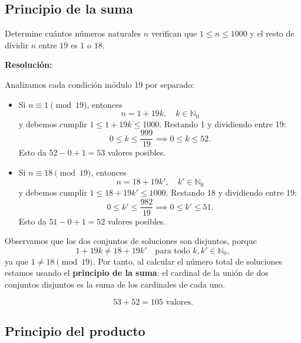 \documentclass[a4paper,12pt]{article}
\begin{document}
\subsection{Principio de la suma}

\begin{ejercicio}[title=Ejercicio 4]
Determine cuántos números naturales $n$ verifican que $1 \le n \le 1000$ y el resto de dividir $n$ entre $19$ es $1$ o $18$.

\tcblower
\textbf{Resolución:}

Analizamos cada condición módulo 19 por separado:

\begin{itemize}
\item Si $n \equiv 1 \pmod{19}$, entonces
\[
n = 1 + 19k, \quad k \in \mathbb{N}_0
\]
y debemos cumplir $1 \le 1 + 19k \le 1000$.  
Restando 1 y dividiendo entre 19:
\[
0 \le k \le \frac{999}{19} \implies 0 \le k \le 52.
\]  
Esto da $52 - 0 + 1 = 53$ valores posibles.

\item Si $n \equiv 18 \pmod{19}$, entonces
\[
n = 18 + 19k', \quad k' \in \mathbb{N}_0
\]
y debemos cumplir $1 \le 18 + 19k' \le 1000$.  
Restando 18 y dividiendo entre 19:
\[
0 \le k' \le \frac{982}{19} \implies 0 \le k' \le 51.
\]  
Esto da $51 - 0 + 1 = 52$ valores posibles.
\end{itemize}

Observamos que los dos conjuntos de soluciones son disjuntos, porque
\[
1 + 19k \neq 18 + 19k' \quad \text{para todo } k,k' \in \mathbb{N}_0,
\] 
ya que $1 \neq 18 \pmod{19}$.  
Por tanto, al calcular el número total de soluciones estamos usando el \textbf{principio de la suma}: el cardinal de la unión de dos conjuntos disjuntos es la suma de los cardinales de cada uno.

\[
53 + 52 = \boxed{105 \text{ valores.}}
\]

\end{ejercicio}

\subsection{Principio del producto}
\end{document}
